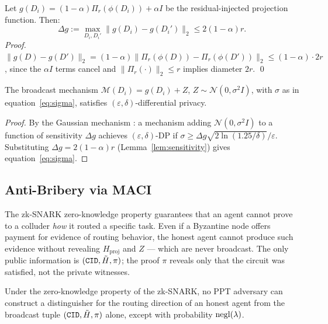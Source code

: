 \begin{lemma}
  \label{lem:sensitivity}
  Let $g(D_i) = (1-\alpha)\Pi_r(\phi(D_i)) + \alpha I$ be the residual-injected
  projection function.  Then:
  \[
    \Delta g := \max_{D_i, D_i'} \|g(D_i) - g(D_i')\|_2 \leq 2(1-\alpha)r.
  \]
  \emph{Proof.} $\|g(D) - g(D')\|_2 = (1-\alpha)\|\Pi_r(\phi(D)) - \Pi_r(\phi(D'))\|_2
  \leq (1-\alpha) \cdot 2r$, since the $\alpha I$ terms cancel and
  $\|\Pi_r(\cdot)\|_2 \leq r$ implies diameter $2r$.  \qed
\end{lemma}

\begin{theorem}
  \label{thm:dp_guarantee}
  The \fedsink{} broadcast mechanism $\mathcal{M}(D_i) = g(D_i) + Z$,
  $Z \sim \mathcal{N}(0, \sigma^2 I)$, with $\sigma$ as in equation~\eqref{eq:sigma},
  satisfies $(\varepsilon, \delta)$-differential privacy.
\end{theorem}

\begin{proof}
  By the Gaussian mechanism \cite{dwork2014algorithmic}: a mechanism adding
  $\mathcal{N}(0, \sigma^2 I)$ to a function of sensitivity $\Delta g$ achieves
  $(\varepsilon, \delta)$-DP if
  $\sigma \geq \Delta g \sqrt{2\ln(1.25/\delta)}/\varepsilon$.
  Substituting $\Delta g = 2(1-\alpha)r$ (Lemma~\ref{lem:sensitivity}) gives
  equation~\eqref{eq:sigma}.
\end{proof}

\subsection{Anti-Bribery via MACI}

The zk-SNARK zero-knowledge property guarantees that an agent cannot prove to a colluder
\emph{how} it routed a specific task.  Even if a Byzantine node offers payment for
evidence of routing behavior, the honest agent cannot produce such evidence without
revealing $H_{\mathrm{proj}}$ and $Z$ — which are never broadcast.  The only public
information is $(\mathtt{CID}, \tilde{H}, \pi)$; the proof $\pi$ reveals only that the circuit
was satisfied, not the private witnesses.

\begin{claim}
  \label{claim:anti_bribery}
  Under the zero-knowledge property of the zk-SNARK, no PPT adversary can construct a
  distinguisher for the routing direction of an honest agent from the broadcast tuple
  $(\mathtt{CID}, \tilde{H}, \pi)$ alone, except with probability $\mathrm{negl}(\lambda)$.
\end{claim}

